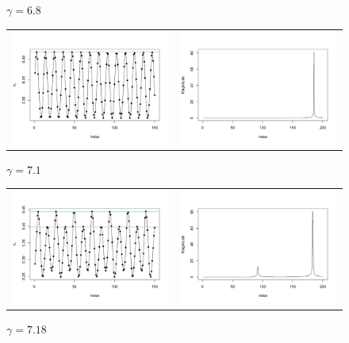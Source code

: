 \documentclass[10pt]{Configuration_Files/PoliMi3i_thesis}
\begin{document}
\begin{figure}[!h]
\centering
\textbf{\footnotesize{$\gamma=6.8$}}
    \begin{tabular}{cc}
    \includegraphics[width=0.45\linewidth]{images/Chapter 6.3/unnamed-chunk-3-1.png} &
    \includegraphics[width=0.45\linewidth]{images/Chapter 6.3/unnamed-chunk-4-1.png} 
    \end{tabular}
 \textbf{\footnotesize{$\gamma=7.1$}}   
    \begin{tabular}{cc}
    \includegraphics[width=0.45\linewidth]{images/Chapter 6.3/unnamed-chunk-5-1.png} &
    \includegraphics[width=0.45\linewidth]{images/Chapter 6.3/unnamed-chunk-6-1.png} 
    \end{tabular}
 \textbf{\footnotesize{$\gamma=7.18$}}   
    \begin{tabular}{cc}

\end{tabular}
\end{figure}
\end{document}
